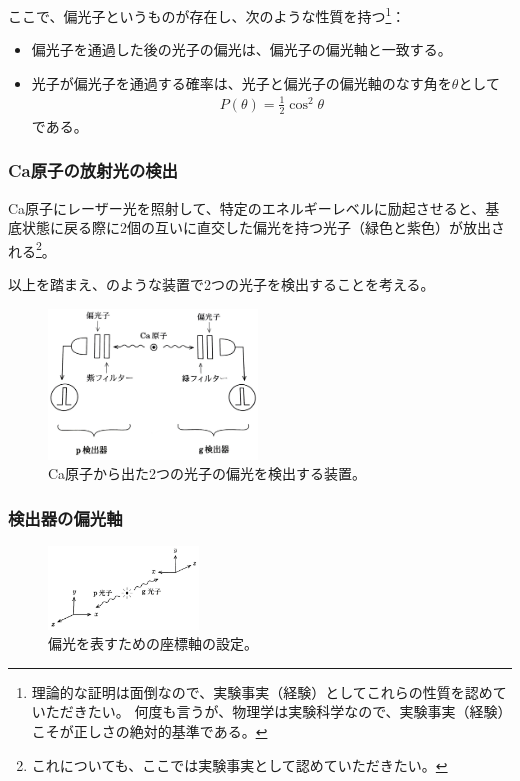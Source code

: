 \documentclass[10pt,b5paper,papersize,dvipdfmx]{jsbook}
\begin{document}
\par
ここで、偏光子というものが存在し、次のような性質を持つ\footnote{
  理論的な証明は面倒なので、実験事実（経験）としてこれらの性質を認めていただきたい。
  何度も言うが、物理学は実験科学なので、実験事実（経験）こそが正しさの絶対的基準である。
}：
\begin{itemize}
  \item 偏光子を通過した後の光子の偏光は、偏光子の偏光軸と一致する。
  \item 光子が偏光子を通過する確率は、光子と偏光子の偏光軸のなす角を$\theta$として
    \begin{align}
      P(\theta) = \frac12 \cos^2\theta
    \end{align}
    である。
\end{itemize}

%
\subsubsection{Ca原子の放射光の検出} %

Ca原子にレーザー光を照射して、特定のエネルギーレベルに励起させると、基底状態に戻る際に2個の互いに直交した偏光を持つ光子（緑色と紫色）が放出される\footnote{
  これについても、ここでは実験事実として認めていただきたい。
}。\par
以上を踏まえ、のような装置で2つの光子を検出することを考える。

\begin{figure}[htb]
  \centering
  \includegraphics[height=40mm]{nkym/fig/souchi.jpeg}
  \caption{Ca原子から出た2つの光子の偏光を検出する装置。} %
  \label{fig:Ca-machine}
\end{figure}

%
\subsubsection{検出器の偏光軸} %

\begin{figure}[ht]
  \centering
  \includegraphics[width=40mm]{nkym/fig/zahyou-kei.jpeg}
  \caption{偏光を表すための座標軸の設定。} %
  \label{fig:zahyou-jiku}
\end{figure}
\end{document}
